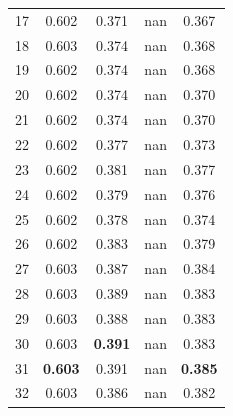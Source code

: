 \documentclass[11pt,a4paper]{article}
\begin{document}
\begin{table}[H]
\begin{tabular}{rcccc}
17 & 0.602 & 0.371 & nan & 0.367 \\

18 & 0.603 & 0.374 & nan & 0.368 \\

19 & 0.602 & 0.374 & nan & 0.368 \\

20 & 0.602 & 0.374 & nan & 0.370 \\

21 & 0.602 & 0.374 & nan & 0.370 \\

22 & 0.602 & 0.377 & nan & 0.373 \\

23 & 0.602 & 0.381 & nan & 0.377 \\

24 & 0.602 & 0.379 & nan & 0.376 \\

25 & 0.602 & 0.378 & nan & 0.374 \\

26 & 0.602 & 0.383 & nan & 0.379 \\

27 & 0.603 & 0.387 & nan & 0.384 \\

28 & 0.603 & 0.389 & nan & 0.383 \\

29 & 0.603 & 0.388 & nan & 0.383 \\

30 & 0.603 & \textbf{0.391} & nan & 0.383 \\

31 & \textbf{0.603} & 0.391 & nan & \textbf{0.385} \\

32 & 0.603 & 0.386 & nan & 0.382 \\

\bottomrule

\end{tabular}

\end{table}
\end{document}
